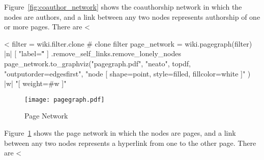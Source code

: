 \documentclass{scrartcl}
\begin{document}
Figure~\ref{fig:coauthor_network} shows the coauthorship network in which the nodes are authors, and a link between any two nodes represents authorship of one or more pages. There are <%



<%
filter = wiki.filter.clone # clone filter
page_network = wiki.pagegraph(filter) { |n| [ "label=\"\"" ] }.remove_self_links.remove_lonely_nodes
page_network.to_graphviz("pagegraph.pdf", "neato", topdf, "outputorder=edgesfirst", "node [ shape=point, style=filled, fillcolor=white ]" ) { |w|  "[ weight=#{w} ]" }

\begin{figure}[htbp]
	\centering
	\texttt{[image: pagegraph.pdf]}
	\caption{Page Network}
	\label{fig:page_network}
\end{figure}

Figure~\ref{fig:page_network} shows the page network in which the nodes are pages, and a link between any two nodes represents a hyperlink from one to the other page. There are <%




\end{document}
